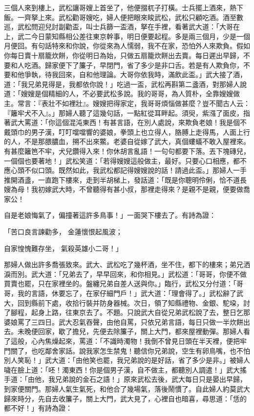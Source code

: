 三個人來到樓上，武松讓哥嫂上首坐了，他便掇杌子打橫。士兵擺上酒來，熱下飯。一齊拏上來。武松勸哥嫂吃，婦人便把眼來睃武松，武松只顧吃酒。酒至數巡，武松問迎兒討副勸盃，叫士兵篩一盃酒，拏在手裡，看著武大道：「大哥在上，武二今日蒙知縣相公差往東京幹事，明日便要起程。多是兩三個月，少是一個月便回。有句話特來和你說，你從來為人懦弱，我不在家，恐怕外人來欺負。假如你每日賣十扇籠炊餅，你從明日為始，只做五扇籠炊餅出去賣。每日遲出早歸，不要和人吃酒。歸家便下了簾子，早閉門，省了多少是非口舌。若是有人欺負你，不要和他爭執，待我回來，自和他理論。大哥你依我時，滿飲此盃。」武大接了酒，道：「我兄弟見得是，我都依你說！」吃過一盃，武松再斟第二盞酒，對那婦人說道：「嫂嫂是個精細的人，不必要武松多說。我的哥哥，為人質朴，全靠嫂嫂做主。常言：『表壯不如裡壯』。嫂嫂把得家定，我哥哥煩惱做甚麼？豈不聞古人云：『籬牢犬不入』。」那婦人聽了這幾句話，一點紅從耳畔起。須臾，紫漒了面皮，指著武大罵道：「你這個混沌東西！有甚言語，在別人處說，來欺負老娘！我是個不戴頭巾的男子漢，叮叮噹噹響的婆娘，拳頭上也立得人，胳膊上走得馬，人面上行的人，不是那腲膿血，搠不出來鱉。老婆自從嫁了武大，真個螻蟻不敢入屋裡來。有甚麼籬笆不牢，犬兒鑽得入來！你休胡言亂語！一句句都要下落。丟下塊磚兒，一個個也要著地！」武松笑道：「若得嫂嫂這般做主，最好。只要心口相應，都不應心頭不似口頭。既然如此，我武松都記得嫂嫂說的話！請過此盃。」那婦人一手推開酒盞，一直跑下樓來，走到半胡梯上，發話道：「既是你聰明伶俐，恰不道長嫂為母！我初嫁武大時，不曾聽得有甚小叔，那裡走得來？是親不是親，便要做喬家公！

自是老娘悔氣了，偏撞著這許多鳥事！」一面哭下樓去了。有詩為證：

「苦口良言諫勸多，  金蓮懷恨起風波；

自家惶愧難存坐，  氣殺英雄小二哥！」

那婦人做出許多喬張致來。武大、武松吃了幾杯酒，坐不住，都下的樓來；弟兄洒淚而別。武大道：「兄弟去了，早早回來，和你相見。」武松道：「哥哥，你便不做買賣也罷，只在家裡坐的。盤纏兄弟自差人送與你。」臨行，武松又分付道：「哥哥，我的言語，休要忘了，在家仔細門戶！」武大道：「理會得了。」武松辭了武大，回到縣前下處，收拾行裝并防身器械。次日，領了知縣禮物、金銀、駝垜，討了腳程，起身上路，往東京去了。不題。只說武大自從兄弟武松說了去，整日乞那婆娘罵了三四日。武大忍氣吞聲，由他自罵，只依兄弟言語，每日只做一半炊餅出去。未晚便回家，歇了擔兒，先便去除簾子，關上大門，都來屋裡動彈。那婦人看了這般，心內焦燥起來，罵道：「不識時濁物！我倒不曾見日頭在半天裡，便把牢門關了，也吃鄰舍家話。說我家怎生禁鬼！聽信你兄弟說，空生有卵鳥嘴，也不怕別人笑恥！」武大道：「由他笑也罷，我兄弟說的是好話，省了多少是非。」被婦人噦在臉上道：「呸！濁東西！你是個男子漢，自不做主，都聽別人調遣！」武大搖手道：「由他，我兄弟說的金石之語！」原來武松去後，武大每日只是晏出早歸，到家便關門。那婦人氣生氣死，和他合了幾場氣，落後鬧慣了。自此婦人約莫武大歸來時分，先自去收簾子，關上大門，武大見了，心裡自也暗喜，尋思道：「恁的都不好！」有詩為證：

